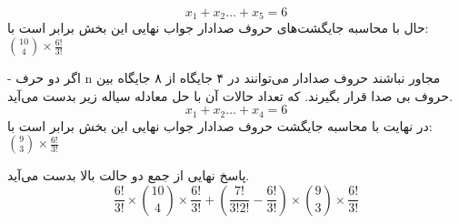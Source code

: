 \begin{enumerate}
$$x_1 + x_2 \ldots + x_5 = 6$$
حال با محاسبه جایگشت‌های حروف صدادار جواب نهایی این بخش برابر است با:
$\binom{10}{4}\times\frac{6!}{3!}$

-
اگر دو حرف n مجاور نباشند حروف صدادار می‌توانند در ۴ جایگاه از ۸ جایگاه بین حروف بی صدا قرار بگیرند. که تعداد حالات آن با حل معادله سیاله زیر بدست می‌آید.
$$x_1 + x_2 \ldots + x_4 = 6$$
در نهایت با محاسبه جایگشت حروف صدادار جواب نهایی این بخش برابر است با:
$\binom{9}{3}\times\frac{6!}{3!}$

پاسخ نهایی از جمع دو حالت بالا بدست می‌آید.
$$\frac{6!}{3!}\times\binom{10}{4}\times\frac{6!}{3!}+ (\frac{7!}{3!2!} - \frac{6!}{3!})\times\binom{9}{3}\times\frac{6!}{3!}$$

\end{enumerate}